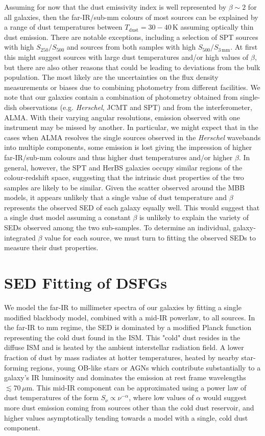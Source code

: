 Assuming for now that the dust emissivity index is well represented by $\beta \sim 2$ for all galaxies, then the far-IR/sub-mm colours of most sources can be explained by a range of dust temperatures between $T_{\textrm{dust}} = 30 - 40\,$K assuming optically thin dust emission. There are notable exceptions, including a selection of SPT sources with high $S_{250}/S_{500}$ and sources from both samples with high $S_{500}/S_{3\,\textrm{mm}}$. At first this might suggest sources with large dust temperatures and/or high values of $\beta$, but there are also other reasons that could be leading to deviations from the bulk population. The most likely are the uncertainties on the flux density measurements or biases due to combining photometry from different facilities. We note that our galaxies contain a combination of photometry obtained from single-dish observations (e.g. \textit{Herschel}, JCMT and SPT) and from the interferometer, ALMA. With their varying angular resolutions, emission observed with one instrument may be missed by another. In particular, we might expect that in the cases when ALMA resolves the single sources observed in the \textit{Herschel} wavebands into multiple components, some emission is lost giving the impression of higher far-IR/sub-mm colours and thus higher dust temperatures and/or higher $\beta$. In general, however, the SPT and HerBS galaxies occupy similar regions of the colour-redshift space, suggesting that the intrinsic dust properties of the two samples are likely to be similar. Given the scatter observed around the MBB models, it appears unlikely that a single value of dust temperature and $\beta$ represents the observed SED of each galaxy equally well. This would suggest that a single dust model assuming a constant $\beta$ is unlikely to explain the variety of SEDs observed among the two sub-samples. To determine an individual, galaxy-integrated $\beta$ value for each source, we must turn to fitting the observed SEDs to measure their dust properties.

\section{SED Fitting of DSFGs}
\label{sec:sed_fitting}

We model the far-IR to millimeter spectra of our galaxies by fitting a single modified blackbody model, combined with a mid-IR powerlaw, to all sources. In the far-IR to mm regime, the SED is dominated by a modified Planck function representing the cold dust found in the ISM. This "cold" dust resides in the diffuse ISM and is heated by the ambient interstellar radiation field. A lower fraction of dust by mass radiates at hotter temperatures, heated by nearby star-forming regions, young OB-like stars or AGNs which contribute substantially to a galaxy's IR luminosity and dominates the emission at rest frame wavelengths $\lesssim 70\,\mu$m. This mid-IR component can be approximated using a power law of dust temperatures of the form $S_\nu \propto \nu^{-\alpha}$, where low values of $\alpha$ would suggest more dust emission coming from sources other than the cold dust reservoir, and higher values asymptotically tending towards a model with a single, cold dust component.

